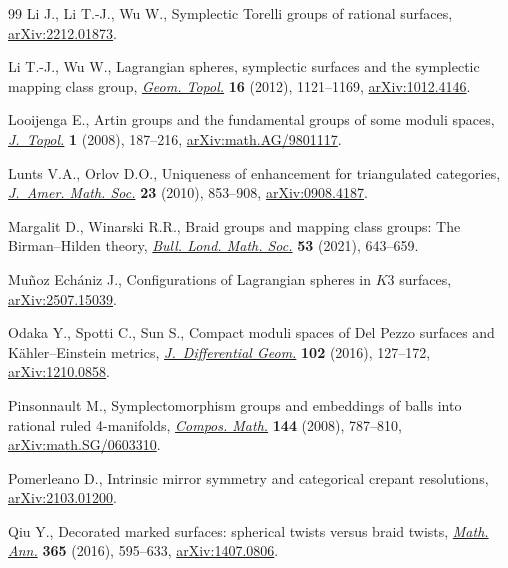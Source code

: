 \documentclass[10pt,a4paper]{amsart}
\theoremstyle{definition}
\numberwithin{equation}{section}
\begin{document}
\begin{thebibliography}{99}
Li J., Li T.-J., Wu W., Symplectic {T}orelli groups of rational surfaces,
 \href{http://arxiv.org/abs/2212.01873}{arXiv:2212.01873}.

Li T.-J., Wu W., Lagrangian spheres, symplectic surfaces and the symplectic
 mapping class group,
 \href{https://doi.org/10.2140/gt.2012.16.1121}{\textit{Geom. Topol.}}
 \textbf{16} (2012), 1121--1169,
 \href{http://arxiv.org/abs/1012.4146}{arXiv:1012.4146}.

Looijenga E., Artin groups and the fundamental groups of some moduli spaces,
 \href{https://doi.org/10.1112/jtopol/jtm009}{\textit{J.~Topol.}} \textbf{1}
 (2008), 187--216,
 \href{http://arxiv.org/abs/math.AG/9801117}{arXiv:math.AG/9801117}.

Lunts V.A., Orlov D.O., Uniqueness of enhancement for triangulated categories,
 \href{https://doi.org/10.1090/S0894-0347-10-00664-8}{\textit{J.~Amer. Math.
 Soc.}} \textbf{23} (2010), 853--908,
 \href{http://arxiv.org/abs/0908.4187}{arXiv:0908.4187}.

Margalit D., Winarski R.R., Braid groups and mapping class groups: {T}he
 {B}irman--{H}ilden theory,
 \href{https://doi.org/10.1112/blms.12456}{\textit{Bull. Lond. Math. Soc.}}
 \textbf{53} (2021), 643--659.

Mu\~noz Ech\'aniz J., Configurations of {L}agrangian spheres in {$K3$}
 surfaces, \href{http://arxiv.org/abs/2507.15039}{arXiv:2507.15039}.

Odaka Y., Spotti C., Sun S., Compact moduli spaces of {D}el {P}ezzo surfaces
 and {K}\"{a}hler--{E}instein metrics,
 \href{https://doi.org/10.4310/jdg/1452002879}{\textit{J.~Differential Geom.}}
 \textbf{102} (2016), 127--172,
 \href{http://arxiv.org/abs/1210.0858}{arXiv:1210.0858}.

Pinsonnault M., Symplectomorphism groups and embeddings of balls into rational
 ruled 4-manifolds,
 \href{https://doi.org/10.1112/S0010437X0700334X}{\textit{Compos. Math.}}
 \textbf{144} (2008), 787--810,
 \href{http://arxiv.org/abs/math.SG/0603310}{arXiv:math.SG/0603310}.

Pomerleano D., Intrinsic mirror symmetry and categorical crepant resolutions,
 \href{http://arxiv.org/abs/2103.01200}{arXiv:2103.01200}.

Qiu Y., Decorated marked surfaces: spherical twists versus braid twists,
 \href{https://doi.org/10.1007/s00208-015-1339-0}{\textit{Math. Ann.}}
 \textbf{365} (2016), 595--633,
 \href{http://arxiv.org/abs/1407.0806}{arXiv:1407.0806}.


\end{thebibliography}
\end{document}
